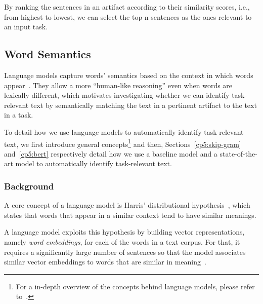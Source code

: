 By ranking the sentences in an artifact according to their similarity scores, i.e., from highest to lowest,
we can  select the top-n sentences as the ones relevant to an input task.



\subsection{Word Semantics}


Language models capture words' semantics based on the context in which words appear~\cite{harris1954distributional}.
They allow a more ``human-like reasoning'' even when words are lexically different, which 
motivates investigating whether we can identify task-relevant text by semantically matching the text in a pertinent artifact to the text in a task.



To detail how we use language models to automatically identify task-relevant text,
 we first introduce general concepts\footnote{
    For a in-depth overview of the concepts behind language models, please refer to~\cite{zhang2021deep-learning}.
} and then, 
Sections~\ref{cp5:skip-gram} and~\ref{cp5:bert} respectively
detail how we use a baseline model and 
a state-of-the-art model to automatically identify task-relevant text.





\subsubsection{Background}


A core concept of a language model is Harris' distributional hypothesis~\cite{harris1954distributional}, which states that words that appear in a similar context tend to have similar meanings.


A language model exploits this hypothesis by building vector representations, namely \textit{word embeddings}, for each of the words in a text corpus.
For that, it requires a significantly large number of sentences so that
the model associates similar vector embeddings to words that are similar in meaning~\cite{Ye2016}. 


